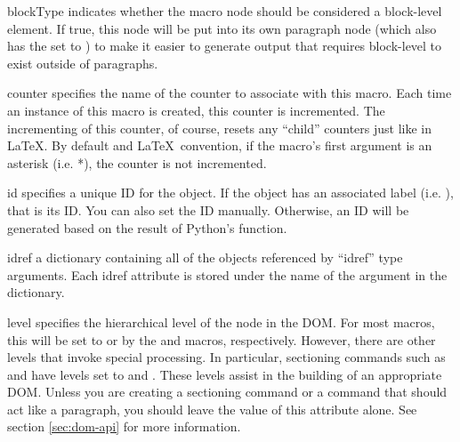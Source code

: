 \begin{memberdesc}[Macro]{blockType}
indicates whether the macro node should be considered a block-level
element.  If true, this node will be put into its own paragraph node
(which also has the  set to ) to make it easier 
to generate output that requires block-level to exist outside of paragraphs.
\end{memberdesc}

\begin{memberdesc}[Macro]{counter}
specifies the name of the counter to associate with this macro.  Each time
an instance of this macro is created, this counter is incremented.  
The incrementing of this counter, of course, resets any ``child'' counters
just like in \LaTeX.  By default and \LaTeX\ convention, if the macro's first 
argument is an asterisk (i.e. *), the counter is not incremented.
\end{memberdesc}

\begin{memberdesc}[Macro]{id}
specifies a unique ID for the object.  If the object has an associated 
label (i.e. ), that is its ID.  You can also set the ID 
manually.  Otherwise, an ID will be generated based on the result of Python's
 function.
\end{memberdesc}

\begin{memberdesc}[Macro]{idref}
a dictionary containing all of the objects referenced by ``idref'' type
arguments.  Each idref attribute is stored under the name of the 
argument in the  dictionary.
\end{memberdesc}

\begin{memberdesc}[Macro]{level}
specifies the hierarchical level of the node in the DOM.  For most macros,
this will be set to  or 
 by the  and 
macros, respectively.  However, there are other levels that invoke special
processing.  In particular, sectioning commands such as  and
 have levels set to  and 
.  These levels assist in the building of 
an appropriate DOM.  Unless you are creating a sectioning command or a command
that should act like a paragraph, you should leave the value of this attribute
alone.  See section \ref{sec:dom-api} for more information.
\end{memberdesc}

